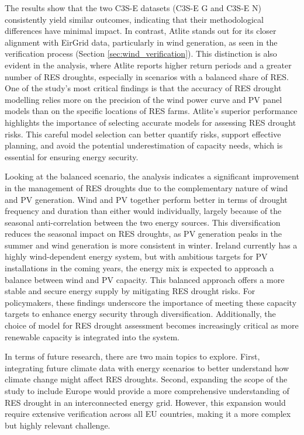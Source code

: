 \documentclass[a4paper, 11pt]{article}
\begin{document}
The results show that the two C3S-E datasets (C3S-E G and C3S-E N) consistently yield similar outcomes, indicating that their methodological differences have minimal impact. In contrast, Atlite stands out for its closer alignment with EirGrid data, particularly in wind generation, as seen in the verification process (Section \ref{sec:wind_verification}). This distinction is also evident in the analysis, where Atlite reports higher return periods and a greater number of RES droughts, especially in scenarios with a balanced share of RES. One of the study's most critical findings is that the accuracy of RES drought modelling relies more on the precision of the wind power curve and PV panel models than on the specific locations of RES farms. Atlite’s superior performance highlights the importance of selecting accurate models for assessing RES drought risks. This careful model selection can better quantify risks, support effective planning, and avoid the potential underestimation of capacity needs, which is essential for ensuring energy security.

Looking at the balanced scenario, the analysis indicates a significant improvement in the management of RES droughts due to the complementary nature of wind and PV generation. Wind and PV together perform better in terms of drought frequency and duration than either would individually, largely because of the seasonal anti-correlation between the two energy sources. This diversification reduces the seasonal impact on RES droughts, as PV generation peaks in the summer and wind generation is more consistent in winter. Ireland currently has a highly wind-dependent energy system, but with ambitious targets for PV installations in the coming years, the energy mix is expected to approach a balance between wind and PV capacity. This balanced approach offers a more stable and secure energy supply by mitigating RES drought risks. For policymakers, these findings underscore the importance of meeting these capacity targets to enhance energy security through diversification. Additionally, the choice of model for RES drought assessment becomes increasingly critical as more renewable capacity is integrated into the system.

In terms of future research, there are two main topics to explore. First, integrating future climate data with energy scenarios to better understand how climate change might affect RES droughts. Second, expanding the scope of the study to include Europe would provide a more comprehensive understanding of RES drought in an interconnected energy grid. However, this expansion would require extensive verification across all EU countries, making it a more complex but highly relevant challenge.
\end{document}
